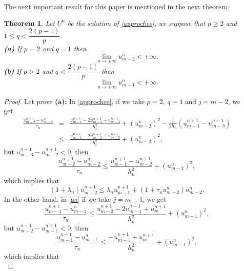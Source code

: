 \documentclass[a4paper,12pt,english,reqno]{smfart}
\newtheorem{th1}{Theorem}[section]
\begin{document}
	The next important result for this paper is mentioned in the next theorem:
	\begin{th1}
		Let $U^{n}$ be the solution of \eqref{approchee}, we suppose that $p\geq 2$ and $1\leq q<\dfrac{2(p-1)}{p}.$\\
		\textbf{(a)} If $p=2$ and $q=1$ then 
		\begin{equation*}
		\lim_{n\rightarrow +\infty} u_{m-2}^{n}< +\infty.
		\end{equation*}
		\textbf{(b)} If $p>2$ and $q<\dfrac{2(p-1)}{p}$ then 
		\begin{equation*}
		\lim_{n\rightarrow +\infty} u_{m-1}^{n}< +\infty.
		\end{equation*}
	\end{th1}
	\begin{proof}
		Let prove \textbf{(a):} In \eqref{approchee}, if we take $p=2,\ q=1$ and $j=m-2$, we get
		\begin{eqnarray*}
			\frac{u_{m-2}^{n+1}-u_{m-2}^{n}}{\tau_{n}}&=&\frac{u_{m-1}^{n+1}-2u_{m-2}^{n+1}+u_{m-3}^{n+1}}{h_{n}^{2}}+\left(u_{m-2}^{n}\right)^{2}-\frac{1}{2h_{n}}\left(u_{m-1}^{n+1}-u_{m-3}^{n+1}\right)\\
			&\leq& \frac{u_{m-1}^{n+1}-2u_{m-2}^{n+1}+u_{m-3}^{n+1}}{h_{n}^{2}}+\left(u_{m-2}^{n}\right)^{2},
		\end{eqnarray*}
		but $u_{m-3}^{n+1}-u_{m-2}^{n+1}<0$, then
		\begin{equation*}
		\dfrac{u_{m-2}^{n+1}-u_{m-2}^{n}}{\tau_{n}}\leq \dfrac{u_{m-1}^{n+1}-u_{m-2}^{n+1}}{h_{n}^{2}}+\left(u_{m-2}^{n}\right)^{2},
		\end{equation*}
		which implies that 
		\begin{equation}
		(1+\lambda_{n})u_{m-2}^{n+1}\leq \lambda_{n}u_{m-1}^{n+1}+\left(1+\tau_{n}u_{m-2}^{n}\right)u_{m-2}^{n}.
		\label{eq46}
		\end{equation}
		In the other hand, in \eqref{aa} if we take $j=m-1$, we get
		\begin{equation*}
		\frac{u_{m-1}^{n+1}-u_{m-1}^{n}}{\tau_{n}}\leq \frac{u_{m-2}^{n+1}-2u_{m-1}^{n+1}+u_{m}^{n+1}}{h_{n}^{2}}+\left(u_{m-1}^{n}\right)^{2},
		\end{equation*}
		but $u_{m-2}^{n+1}-u_{m-1}^{n+1}<0$, then
		\begin{equation*}
		\frac{u_{m-1}^{n+1}-u_{m-1}^{n}}{\tau_{n}}\leq \frac{-u_{m-1}^{n+1}+u_{m}^{n+1}}{h_{n}^{2}}+\left(u_{m-1}^{n}\right)^{2},
		\end{equation*}
		which implies that 
		\begin{equation*}

\end{equation*}
\end{proof}
\end{document}
